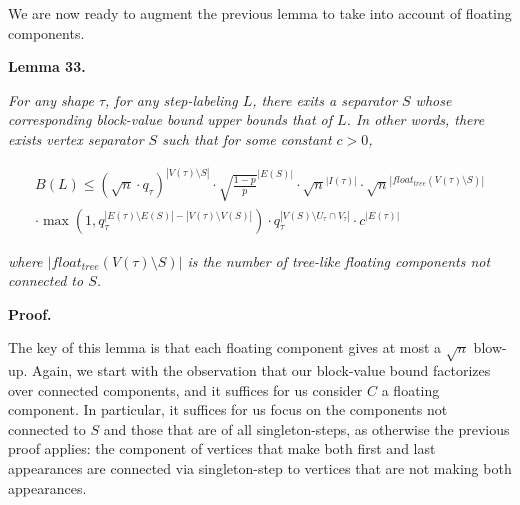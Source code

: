 We are now ready to augment the previous lemma to take into account of floating components.\par





\par\medskip\noindent\textbf{
\textbf{Lemma 33}\textbf{.}
}\par



\emph{For any shape $\tau$, for any step-labeling $L$, there exits a separator $S$ whose corresponding block-value bound upper bounds that of $L$. In other words, there exists vertex separator $S$ such that for some constant $c>0$,}\par


\[\begin{gathered}
\displaystyle B(L) \displaystyle\leq(\sqrt{n}\cdot q_{\tau})^{|V(\tau)\setminus S|}\cdot\sqrt{\frac{1-p}{p}}^{|E(S)|}\cdot\sqrt{n}^{|I(\tau)|}\cdot\sqrt{n}^{|float_{tree}(V(\tau)\setminus S)|} \\
\displaystyle\cdot\max(1,q_{\tau}^{|E(\tau)\setminus E(S)|-|V(\tau)\setminus V(S)|})\cdot q_{\tau}^{|V(S)\setminus U_{\tau}\cap V_{\tau}|}\cdot c^{|E(\tau)|}
\end{gathered}\]


\emph{where $|float_{tree}(V(\tau)\setminus S)|$ is the number of tree-like floating components not connected to $S$.}\par







\par\medskip\noindent\textbf{Proof.}\par




The key of this lemma is that each floating component gives at most a $\sqrt{n}$ blow-up.
Again, we start with the observation that our block-value bound factorizes over connected components, and it suffices for us consider $C$ a floating component. In particular, it suffices for us focus on the components not connected to $S$ and those that are of all singleton-steps, as otherwise the previous proof applies: the component of vertices that make both first and last appearances are connected via singleton-step to vertices that are not making both appearances.\par




